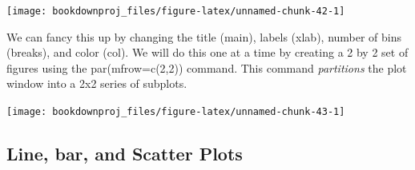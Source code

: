\documentclass[
]{book}
\newenvironment{Shaded}{\begin{snugshade}}{\end{snugshade}}
\newcommand{\AttributeTok}[1]{\textcolor[rgb]{0.77,0.63,0.00}{#1}}
\newcommand{\DecValTok}[1]{\textcolor[rgb]{0.00,0.00,0.81}{#1}}
\newcommand{\FunctionTok}[1]{\textcolor[rgb]{0.00,0.00,0.00}{#1}}
\newcommand{\NormalTok}[1]{#1}
\newcommand{\SpecialCharTok}[1]{\textcolor[rgb]{0.00,0.00,0.00}{#1}}
\newcommand{\StringTok}[1]{\textcolor[rgb]{0.31,0.60,0.02}{#1}}
\begin{document}
\begin{Shaded}
\end{Shaded}

\begin{center}\texttt{[image: bookdownproj\_files/figure-latex/unnamed-chunk-42-1]} \end{center}

We can fancy this up by changing the title (main), labels (xlab), number of bins (breaks), and color (col). We will do this one at a time by creating a 2 by 2 set of figures using the par(mfrow=c(2,2)) command. This command \emph{partitions} the plot window into a 2x2 series of subplots.

\begin{Shaded}
\end{Shaded}

\begin{center}\texttt{[image: bookdownproj\_files/figure-latex/unnamed-chunk-43-1]} \end{center}

\hypertarget{line-bar-and-scatter-plots}{%
\subsection{Line, bar, and Scatter Plots}\label{line-bar-and-scatter-plots}}
\end{document}
